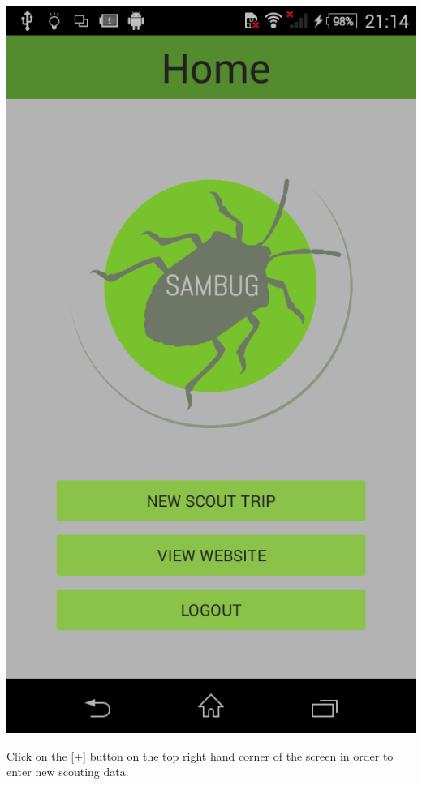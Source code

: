 \documentclass[11pt,a4paper,titlepage]{article}
\begin{document}
\begin{enumerate}
\begin{center}
				\includegraphics[scale=0.3]{home_nf}
			\end{center}
			Click on the [+] button on the top right hand corner of the screen in order to enter new scouting data.


\end{enumerate}
\end{document}
